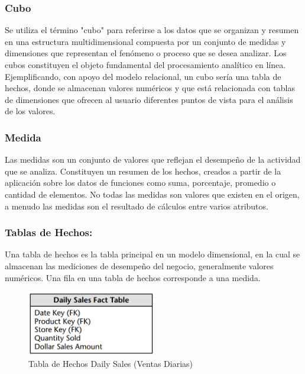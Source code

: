 \subsubsection{Cubo}

Se utiliza el término "cubo" para referirse a los datos que se organizan y resumen en una estructura multidimensional compuesta 
por un conjunto de medidas y dimensiones que representan el fenómeno o proceso que se desea analizar. Los cubos constituyen 
el objeto fundamental del procesamiento analítico en línea\cite{lismaster}. Ejemplificando, con apoyo del modelo relacional, 
un cubo sería una tabla de hechos, donde se almacenan valores numéricos y que est\'a relacionada con tablas de dimensiones 
que ofrecen al usuario diferentes puntos de vista para el análisis de los valores.

\subsubsection{Medida}

Las medidas son un conjunto de valores que reflejan el desempeño de la actividad que se analiza. Constituyen un resumen de los 
hechos\cite{lismaster}, creados a partir de la aplicación sobre los datos de funciones como suma, porcentaje, promedio o cantidad 
de elementos. No todas las medidas son valores que existen en el origen, a menudo las medidas son el resultado de cálculos entre 
varios atributos.

%
\subsubsection{Tablas de Hechos: }
%
Una tabla de hechos es la tabla principal en un modelo dimensional, en la cual se almacenan las mediciones de desempeño del 
negocio, generalmente valores num\'ericos\cite{kimball2011data}. Una fila en una tabla de hechos corresponde a una medida.
%
\begin{figure}[ht]
    \centering
    \includegraphics[width=0.5\textwidth]{../document/Graphics/hechos.png}
    \caption{Tabla de Hechos Daily Sales (Ventas Diarias) \cite{kimball2011data}}
    \label{fig:facts}
  \end{figure}
%

